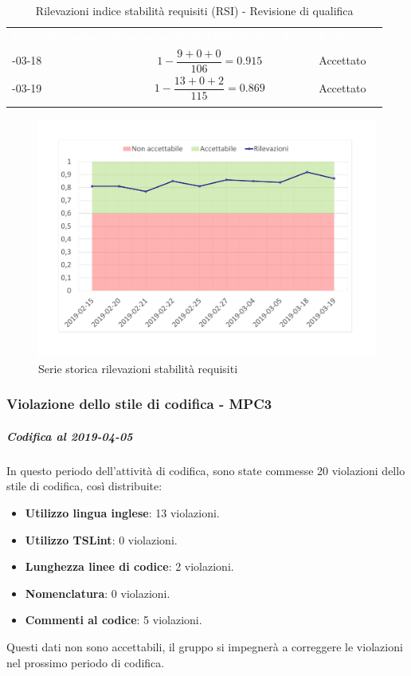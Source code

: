 \begin{longtable}{>{\centering\arraybackslash}m{3cm} >{\centering\arraybackslash}m{4cm} >{\centering\arraybackslash}m{5cm} >{\centering\arraybackslash}m{2cm}}
	\rowcolor{LightBlue}
	\textbf{\textcolor{white}{Data rilevazioni}}
	& \textbf{\textcolor{white}{Requirement Stability Index (RSI)}}
	& \textbf{\textcolor{white}{Esito}}\\
	
	2019-03-18 & \[1-\frac{9+0+0}{106}=0.915\] & Accettato\\
	\hline
	2019-03-19 & \[1-\frac{13+0+2}{115}=0.869\] & Accettato\\
	\hline
	\caption{Rilevazioni indice stabilità requisiti (RSI) - Revisione di qualifica}
\end{longtable}

\begin{figure}[H]
	\centering
	\includegraphics[scale=0.6]{images/resoconto/MPC2Chart.pdf}
	\caption{Serie storica rilevazioni stabilità requisiti}	
\end{figure}


\subsubsection{Violazione dello stile di codifica - MPC3}

\subparagraph{Codifica al 2019-04-05}
In questo periodo dell'attività di codifica, sono state commesse 20 violazioni dello stile di codifica, così distribuite:
 \begin{itemize}
 	\item \textbf{Utilizzo lingua inglese}: 13 violazioni.
 	\item \textbf{Utilizzo TSLint}: 0 violazioni.
 	\item \textbf{Lunghezza linee di codice}: 2 violazioni.
 	\item \textbf{Nomenclatura}: 0 violazioni.
 	\item \textbf{Commenti al codice}: 5 violazioni.
 \end{itemize}
Questi dati non sono accettabili, il gruppo si impegnerà a correggere le violazioni nel prossimo periodo di codifica.

